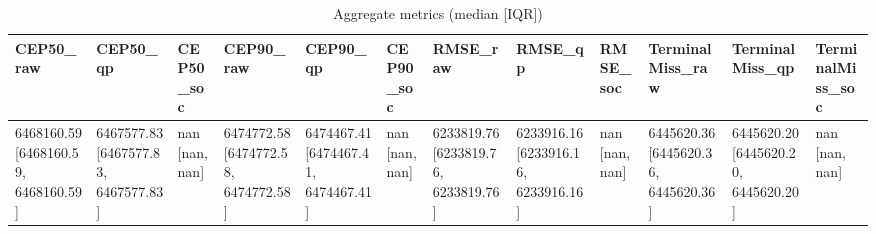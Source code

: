 \begin{table}[t]
\centering
\begin{tabular}{llllllllllll}
\toprule
CEP50_raw & CEP50_qp & CEP50_soc & CEP90_raw & CEP90_qp & CEP90_soc & RMSE_raw & RMSE_qp & RMSE_soc & TerminalMiss_raw & TerminalMiss_qp & TerminalMiss_soc \\
\midrule
6468160.59 [6468160.59, 6468160.59] & 6467577.83 [6467577.83, 6467577.83] & nan [nan, nan] & 6474772.58 [6474772.58, 6474772.58] & 6474467.41 [6474467.41, 6474467.41] & nan [nan, nan] & 6233819.76 [6233819.76, 6233819.76] & 6233916.16 [6233916.16, 6233916.16] & nan [nan, nan] & 6445620.36 [6445620.36, 6445620.36] & 6445620.20 [6445620.20, 6445620.20] & nan [nan, nan] \\
\bottomrule
\end{tabular}
\caption{Aggregate metrics (median [IQR])}
\label{tab:aggregate}
\end{table}
